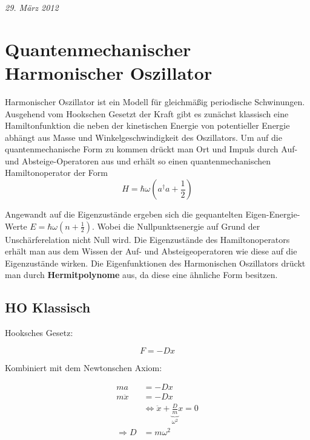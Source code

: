 



\textit{29. März 2012}


\section*{Quantenmechanischer Harmonischer Oszillator}


Harmonischer Oszillator ist ein Modell für gleichmäßig periodische Schwinungen. Ausgehend vom Hookschen Gesetzt der Kraft gibt es zunächst klassisch eine Hamiltonfunktion die neben der kinetischen Energie von potentieller Energie abhängt aus Masse und Winkelgeschwindigkeit des Oszillators. Um auf die quantenmechanische Form zu kommen drückt man Ort und Impuls durch Auf- und Absteige-Operatoren aus und erhält so einen quantenmechanischen Hamiltonoperator der Form
\begin{equation}
  \label{eq:49}
  H=\hbar\omega(a^\dagger a+\frac{1}{2})
\end{equation}

Angewandt auf die Eigenzustände ergeben sich die gequantelten Eigen-Energie-Werte \(E=\hbar\omega(n+\frac{1}{2})\). Wobei die Nullpunktsenergie auf Grund der Unschärferelation nicht Null wird. Die Eigenzustände des Hamiltonoperators erhält man aus dem Wissen der Auf- und Absteigeoperatoren wie diese auf die Eigenzustände wirken. Die Eigenfunktionen des Harmonischen Oszillators drückt man durch \textbf{Hermitpolynome} aus, da diese eine ähnliche Form besitzen.


\subsection*{HO Klassisch}


Hooksches Gesetz:

\begin{equation}
  \label{eq:1}
  F = -Dx
\end{equation}

Kombiniert mit dem Newtonschen Axiom:

\begin{align}
  ma &= -Dx  \\
  m\ddot x &= -Dx \\
&\Leftrightarrow \ddot x + \underbrace{\frac{D}{m}}_{\omega^2}x = 0 \\
\Rightarrow D &= m\omega^2\label{eq:2}
\end{align}

